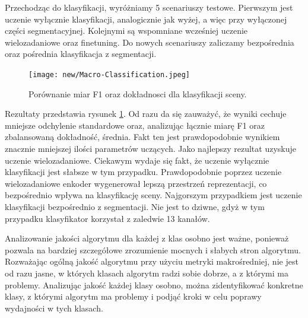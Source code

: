 \vspace{0.5cm}
Przechodząc do klasyfikacji, wyróżniamy 5 scenariuszy testowe. Pierwszym jest uczenie wyłącznie klasyfikacji, analogicznie jak wyżej, a więc przy wyłączonej części segmentacyjnej. Kolejnymi są wspomniane wcześniej uczenie wielozadaniowe oraz finetuning. Do nowych scenariuszy zaliczamy bezpośrednia oraz pośrednia klasyfikacja z segmentacji.
\begin{figure}[ht!]
    \centering
    \texttt{[image: new/Macro-Classification.jpeg]}
    \caption{Porównanie miar F1 oraz dokładnosci dla klasyfikacji sceny.}
    \label{fig:macro-classification}
\end{figure}

Rezultaty przedstawia rysunek \ref{fig:macro-classification}. Od razu da się zauważyć, że wyniki cechuje mniejsze odchylenie standardowe oraz, analizując łącznie miarę F1 oraz zbalansowaną dokładność, średnia. Fakt ten jest prawdopodobnie wynikiem znacznie mniejszej ilości parametrów uczących. Jako najlepszy rezultat uzyskuje uczenie wielozadaniowe. Ciekawym wydaje się fakt, że uczenie wyłącznie klasyfikacji jest słabsze w tym przypadku. Prawdopodobnie poprzez uczenie wielozadaniowe enkoder wygenerował lepszą przestrzeń reprezentacji, co bezpośrednio wpływa na klasyfikację sceny. Najgorszym przypadkiem jest uczenie klasyfikacji bezpośrednio z segmentacji. Nie jest to dziwne, gdyż w tym przypadku klasyfikator korzystał z zaledwie 13 kanałów.
\vspace{0.5cm}

Analizowanie jakości algorytmu dla każdej z klas osobno jest ważne, ponieważ pozwala na bardziej szczegółowe zrozumienie mocnych i słabych stron algorytmu. Rozważając ogólną jakość algorytmu przy użyciu metryki makrośredniej, nie jest od razu jasne, w których klasach algorytm radzi sobie dobrze, a z którymi ma problemy. Analizując jakość każdej klasy osobno, można zidentyfikować konkretne klasy, z którymi algorytm ma problemy i podjąć kroki w celu poprawy wydajności w tych klasach.

